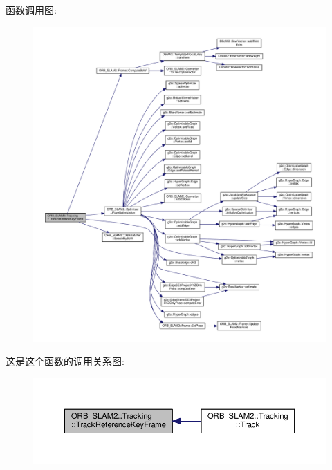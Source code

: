 函数调用图\-:
\nopagebreak
\begin{figure}[H]
\begin{center}
\leavevmode
\includegraphics[width=350pt]{classORB__SLAM2_1_1Tracking_a737c5409c93844353561a0fe724ed1c2_cgraph}
\end{center}
\end{figure}




这是这个函数的调用关系图\-:
\nopagebreak
\begin{figure}[H]
\begin{center}
\leavevmode
\includegraphics[width=350pt]{classORB__SLAM2_1_1Tracking_a737c5409c93844353561a0fe724ed1c2_icgraph}
\end{center}
\end{figure}


